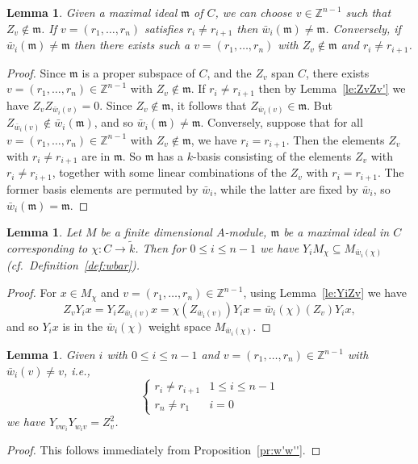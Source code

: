 \documentclass[12pt]{amsart}
\renewcommand{\le}{\leqslant}
\newcommand{\bZ}{{\mathbb{Z}}}
\newcommand{\mfm}{\mathfrak{m}}
\numberwithin{equation}{section}
\newtheorem{lemma}[equation]{Lemma}
\theoremstyle{definition}
\begin{document}
\begin{lemma}\label{le:chiZvne0}
Given a maximal ideal $\mfm$ of $C$, 
we can choose $v\in\bZ^{n-1}$ such that $Z_v\not\in\mfm$.
If $v=(r_1,\dots,r_n)$ satisfies $r_i\ne r_{i+1}$ then $\bar
w_i(\mfm)\ne\mfm$. Conversely, if $\bar w_i(\mfm)\ne\mfm$ then there exists
such a $v=(r_1,\dots,r_n)$ with $Z_v\not\in\mfm$ and $r_i\ne r_{i+1}$.
\end{lemma}
\begin{proof}
Since $\mfm$ is a proper subspace of $C$, and the $Z_v$ span $C$,
there exists $v=(r_1,\dots,r_n)\in\bZ^{n-1}$ with $Z_v\not\in\mfm$. If $r_i\ne
r_{i+1}$ then by Lemma~\ref{le:ZvZv'} we have $Z_vZ_{\bar
  w_i(v)}=0$. Since $Z_v\not\in\mfm$, it follows that $Z_{\bar
  w_i(v)}\in\mfm$. But $Z_{\bar w_i(v)}\not\in\bar w_i(\mfm)$, and so
$\bar w_i(\mfm)\ne\mfm$. Conversely, suppose that for all
$v=(r_1,\dots,r_n)\in\bZ^{n-1}$ with $Z_v \not\in\mfm$, we have
$r_i=r_{i+1}$. Then the elements $Z_v$ with $r_i\ne r_{i+1}$ are in
$\mfm$. So $\mfm$ has a $k$-basis consisting of the elements $Z_v$
with $r_i\ne r_{i+1}$, together with some linear combinations of the
$Z_v$ with $r_i=r_{i+1}$. The former basis elements are permuted by $\bar w_i$, while
the latter are fixed by $\bar w_i$, so $\bar w_i(\mfm)=\mfm$.
\end{proof}


\begin{lemma}\label{le:permute-weights}
Let $M$ be a finite dimensional $A$-module, $\mfm$ be a maximal
ideal in $C$ corresponding to $\chi\colon C \to \tilde k$. Then for
$0\le i\le n-1$ we have
$Y_iM_\chi\subseteq M_{\bar w_i(\chi)}$ (cf.\ Definition~\ref{def:wbar}).
\end{lemma}
\begin{proof}
For $x\in M_\chi$ and $v=(r_1,\dots,r_n)\in\bZ^{n-1}$, using
Lemma~\ref{le:YiZv} we have  
\begin{equation*} 
Z_vY_ix=Y_iZ_{\bar w_i(v)}x=\chi(Z_{\bar w_i(v)})Y_ix = \bar w_i(\chi)(Z_v)Y_ix,
\end{equation*}
and so $Y_ix$ is in the $\bar w_i(\chi)$ weight space $M_{\bar w_i(\chi)}$.
\end{proof}



\begin{lemma}\label{le:vwiwiv}
Given $i$ with $0\le i\le n-1$ and $v=(r_1,\dots,r_n)\in\bZ^{n-1}$
with $\bar w_i(v)\ne v$, i.e.,
\[ \begin{cases} r_i\ne r_{i+1} & 1\le i\le n-1 \\ r_n\ne r_1 &
    i=0 \end{cases} \]
we have $Y_{vw_i}Y_{w_iv}=Z_v^2$.
\end{lemma}
\begin{proof}
This follows immediately from Proposition~\ref{pr:w'w''}.
\end{proof}
\end{document}

